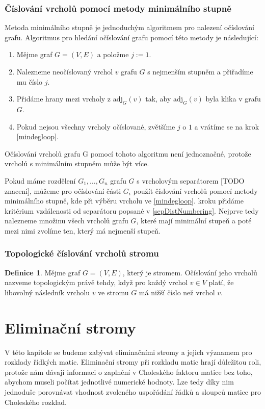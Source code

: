 \documentclass[11pt,american,czech,oneside]{book}
\theoremstyle{plain}
\theoremstyle{definition}
\newtheorem{definition}{Definice}
\begin{document}
\subsection{Číslování vrcholů pomocí metody minimálního stupně}
Metoda minimálního stupně je jednoduchým algoritmem pro nalezení očíslování grafu.
Algoritmus pro hledání očíslování grafu pomocí této metody je následující:

\begin{enumerate}
  \item Mějme graf $G=(V,E)$ a položme $j:=1$.
  \item \label{mindegloop}
      Nalezneme neočíslovaný vrchol $v$ grafu $G$ s nejmenším stupněm a přiřadíme mu číslo $j$.
  \item Přidáme hrany mezi vrcholy z $\mathrm{adj}_G(v)$ tak, aby $\mathrm{adj}_G(v)$ byla klika v grafu $G$.
  \item Pokud nejsou všechny vrcholy očíslované, zvětšíme $j$ o $1$ a vrátíme se na krok \ref{mindegloop}.
\end{enumerate}

Očíslování vrcholů grafu G pomocí tohoto algoritmu není jednoznačné, protože vrcholů s minimálním stupněm může být více.

Pokud máme rozdělení $G_1, \ldots, G_n$ grafu $G$ s vrcholovým separátorem [TODO znaceni], můžeme pro očíslování části $G_i$ použít
číslování vrcholů pomocí metody minimálního stupně, kde při výběru vrcholu ve \ref{mindegloop}. kroku přidáme kritérium vzdálenosti od separátoru
popsané v \ref{sepDistNumbering}. Nejprve tedy nalezneme množinu všech vrcholů grafu $G$, které mají minimální stupeň
a poté mezi nimi zvolíme ten, který má nejmenší stupeň.

\subsection{Topologické číslování vrcholů stromu}
\begin{definition}
    Mějme graf $G = (V,E)$, který je stromem. Očíslování jeho vrcholů nazveme topologickým právě tehdy,
    když pro každý vrchol $v \in V$ platí, že libovolný následník vrcholu $v$ ve stromu $G$ má nižší číslo než vrchol $v$.
\end{definition}


\chapter{Eliminační stromy}
V této kapitole se budeme zabývat eliminačními stromy a jejich významem pro rozklady řídkých matic.
Eliminační stromy při rozkladu matic hrají důležitou roli, protože nám dávají informaci o zaplnění
v Choleského faktoru matice bez toho, abychom museli počítat jednotlivé numerické hodnoty.
Lze tedy díky nim jednoduše porovnávat vhodnost zvoleného uspořádání řádků a sloupců matice pro Choleského rozklad.
\end{document}
